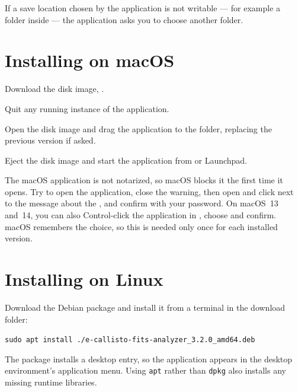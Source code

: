 \begin{note}
  If a save location chosen by the application is not writable --- for example a folder
  inside  --- the application asks you to choose another folder.
\end{note}

\section{Installing on macOS}

\begin{steps}
  \item Download the disk image, .
  \item Quit any running instance of the application.
  \item Open the disk image and drag the application to the  folder,
    replacing the previous version if asked.
  \item Eject the disk image and start the application from  or
    Launchpad.
\end{steps}

\begin{note}
  The macOS application is not notarized, so macOS blocks it the first time it opens. Try to
  open the application, close the warning, then open  and click  next to
  the message about the \appname{}, and confirm with your password. On macOS~13 and~14,
  you can also Control-click the application in , choose 
  and confirm. macOS remembers the
  choice, so this is needed only once for each installed version.
\end{note}

\section{Installing on Linux}

Download the Debian package and install it from a terminal in the download folder:
\begin{center}
  \texttt{sudo apt install ./e-callisto-fits-analyzer\_3.2.0\_amd64.deb}
\end{center}
The package installs a desktop entry, so the application appears in the desktop
environment's application menu. Using \texttt{apt} rather than \texttt{dpkg} also installs
any missing runtime libraries.

